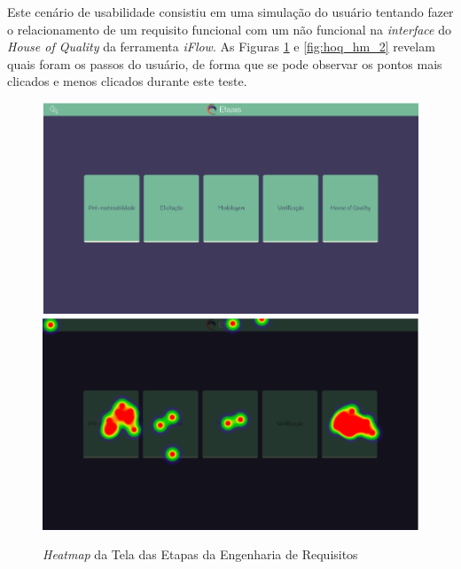 Este cenário de usabilidade consistiu em uma simulação do usuário tentando fazer o relacionamento de um requisito funcional com um não funcional na \textit{interface} do \textit{House of Quality} da ferramenta \textit{iFlow}. As Figuras \ref{fig:hoq_hm_1} e \ref{fig:hoq_hm_2} revelam quais foram os passos do usuário, de forma que se pode observar os pontos mais clicados e menos clicados durante este teste.

\begin{figure}[]
  \begin{center}
      \caption{{\textit{Heatmap} da Tela das Etapas da Engenharia de Requisitos}}
      \label{fig:hoq_hm_1}
      \includegraphics[scale=0.45]{figuras/UsabilityHub/hoq/1.png}
      \includegraphics[scale=0.45]{figuras/UsabilityHub/hoq/2.png}
  \end{center}
\end{figure}

